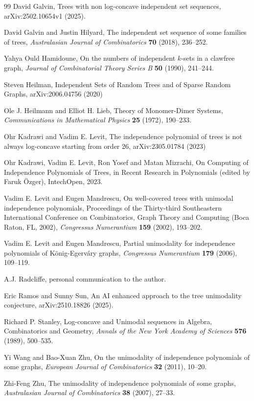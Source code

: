 \documentclass[12pt]{article}
\theoremstyle{definition}
\theoremstyle{definition}
\theoremstyle{definition}
\theoremstyle{definition}
\theoremstyle{definition}
\theoremstyle{definition}
\theoremstyle{definition}
\theoremstyle{definition}
\theoremstyle{remark}
\begin{document}
\begin{thebibliography}{99}
David Galvin, Trees with non log-concave independent set sequences, arXiv:2502.10654v1 (2025).

David Galvin and Justin Hilyard, The independent set sequence of some families of trees, {\it Australasian Journal of Combinatorics} {\bf 70} (2018), 236--252.

Yahya Ould Hamidoune, On the numbers of independent $k$-sets in a clawfree graph, {\it Journal of Combinatorial Theory Series B} {\bf 50} (1990), 241--244.

Steven Heilman, Independent Sets of Random Trees and of Sparse Random Graphs, arXiv:2006.04756 (2020)

Ole J. Heilmann and Elliot H. Lieb, Theory of Monomer-Dimer Systems, {\it Communications in Mathematical Physics} {\bf 25} (1972), 190--233. 

Ohr Kadrawi and Vadim E. Levit, The independence polynomial of trees is not always log-concave starting from order 26, arXiv:2305.01784 (2023)

Ohr Kadrawi, Vadim E. Levit, Ron Yosef and Matan Mizrachi, On Computing of Independence Polynomials of Trees, in Recent Research in Polynomials (edited by Faruk \"Ozger), IntechOpen, 2023.

Vadim E. Levit and Eugen Mandrescu, On well-covered trees with unimodal independence polynomials, Proceedings of the Thirty-third Southeastern International Conference on Combinatorics, Graph Theory and Computing (Boca Raton, FL, 2002), {\it Congressus Numerantium} {\bf 159} (2002), 193--202.

Vadim E. Levit and Eugen Mandrescu, Partial unimodality for independence polynomials of
K\"onig-Egerv\'ary graphs, {\it Congressus Numerantium} {\bf 179} (2006), 109--119.

A.J. Radcliffe, personal communication to the author.

Eric Ramos and Sunny Sun, An AI enhanced approach to the tree unimodality conjecture, arXiv:2510.18826 (2025).

Richard P. Stanley, Log-concave and Unimodal sequences in Algebra, Combinatorics and Geometry, {\it Annals of the New York Academy of Sciences} {\bf 576} (1989), 500--535.

Yi Wang and Bao-Xuan Zhu, On the unimodality of independence polynomials of some graphs, {\it European Journal of Combinatorics} {\bf 32} (2011), 10--20.

Zhi-Feng Zhu, The unimodality of independence polynomials of some graphs, {\it Australasian Journal of Combinatorics} {\bf 38} (2007), 27--33.

\end{thebibliography}
\end{document}
